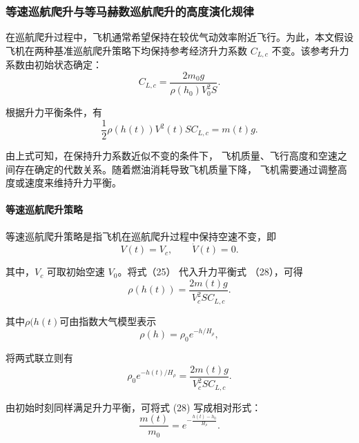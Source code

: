 \documentclass[withoutpreface,bwprint]{cumcmthesis} %
\begin{document}
\subsubsection{等速巡航爬升与等马赫数巡航爬升的高度演化规律}
在巡航爬升过程中，飞机通常希望保持在较优气动效率附近飞行。为此，本文假设飞机在两种基准巡航爬升策略下均保持参考经济升力系数 $C_{L,c}$ 不变。该参考升力系数由初始状态确定：
\begin{equation}
    C_{L,c}
    =
    \frac{2m_0g}{\rho(h_0)V_0^2S}.
    \label{eq:CLc}
\end{equation}

根据升力平衡条件，有
\begin{equation}
    \frac{1}{2}\rho(h(t))V^2(t)S C_{L,c}
    =
    m(t)g.
    \label{eq:lift_balance_cruise_climb}
\end{equation}

由上式可知，在保持升力系数近似不变的条件下，
飞机质量、飞行高度和空速之间存在确定的代数关系。随着燃油消耗导致飞机质量下降，
飞机需要通过调整高度或速度来维持升力平衡。

\paragraph{等速巡航爬升策略}

等速巡航爬升策略是指飞机在巡航爬升过程中保持空速不变，即
\begin{equation}
    V(t)=V_c,
    \qquad
    \dot V(t)=0.
    \label{eq:constant_speed_condition}
\end{equation}

其中，$V_c$ 可取初始空速 $V_0$。将式（25）
代入升力平衡式 （28），可得
\begin{equation}
    \rho(h(t))
    =
    \frac{2m(t)g}{V_c^2S C_{L,c}}.
    \label{eq:rho_constant_speed}
\end{equation}

其中$\rho(h(t)$可由指数大气模型表示
\begin{equation}
	\rho(h)=\rho_0 e^{-h/H_\rho} ,
    \label{eq:rho_exp_for_climb}
\end{equation}

将两式联立则有
\begin{equation}
    \rho_0 e^{-h(t)/H_\rho} 
    =
    \frac{2m(t)g}{V_c^2S C_{L,c}}.
    \label{eq:constant_speed_h_m}
\end{equation}

由初始时刻同样满足升力平衡，可将式 (28) 写成相对形式：
\begin{equation}
    \frac{m(t)}{m_0}
    = e^{-\frac{h(t)-h_0}{H_\rho}}.
    \label{eq:constant_speed_relative}
\end{equation}
\end{document}
